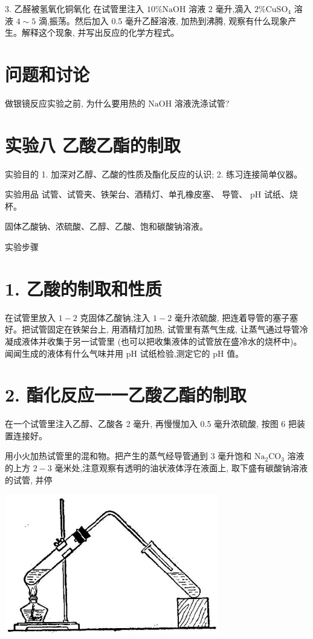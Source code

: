 \documentclass[10pt]{article}
\begin{document}
3. 乙醛被氢氧化铜氧化 在试管里注入 \({10}\% \mathrm{{NaOH}}\) 溶液 2 毫升,滴入 \(2\% {\mathrm{{CuSO}}}_{4}\) 溶液 \(4 \sim 5\) 滴,振荡。然后加入 0.5 毫升乙醛溶液, 加热到沸腾, 观察有什么现象产生。解释这个现象, 并写出反应的化学方程式。

\section*{问题和讨论}

做银镜反应实验之前, 为什么要用热的 \(\mathrm{{NaOH}}\) 溶液洗涤试管?

\section*{实验八 乙酸乙酯的制取}

实验目的 1. 加深对乙醇、乙酸的性质及酯化反应的认识; 2. 练习连接简单仪器。

实验用品 试管、试管夹、铁架台、酒精灯、单孔橡皮塞、 导管、 \(\mathrm{{pH}}\) 试纸、烧杯。

固体乙酸钠、浓硫酸、乙醇、乙酸、饱和碳酸钠溶液。

实验步骤

\section*{1. 乙酸的制取和性质}

在试管里放入 \(1 - 2\) 克固体乙酸钠,注入 \(1 - 2\) 毫升浓硫酸, 把连着导管的塞子塞好。把试管固定在铁架台上, 用酒精灯加热, 试管里有蒸气生成, 让蒸气通过导管冷凝成液体并收集于另一试管里 (也可以把收集液体的试管放在盛冷水的烧杯中)。闻闻生成的液体有什么气味并用 \(\mathrm{{pH}}\) 试纸检验,测定它的 \(\mathrm{{pH}}\) 值。

\section*{2. 酯化反应一一乙酸乙酯的制取}

在一个试管里注入乙醇、乙酸各 2 毫升, 再慢慢加入 0.5 毫升浓硫酸, 按图 6 把装置连接好。

用小火加热试管里的混和物。把产生的蒸气经导管通到 3 毫升饱和 \({\mathrm{{Na}}}_{2}{\mathrm{{CO}}}_{3}\) 溶液的上方 \(2 - 3\) 毫米处,注意观察有透明的油状液体浮在液面上, 取下盛有碳酸钠溶液的试管, 并停

\begin{center}
\includegraphics[max width=0.7\textwidth]{images/01912d16-be99-77bb-9535-4f3ed8d9946f_220_249924.jpg}
\end{center}
\end{document}
